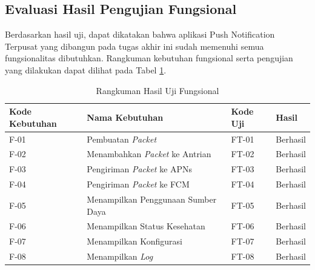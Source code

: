 \subsection{Evaluasi Hasil Pengujian Fungsional}
\par Berdasarkan hasil uji, dapat dikatakan bahwa aplikasi Push Notification Terpusat yang dibangun pada tugas akhir ini sudah memenuhi semua fungsionalitas dibutuhkan. Rangkuman kebutuhan fungsional serta pengujian yang dilakukan dapat dilihat pada Tabel \ref{t:eval_f}.
\begin{longtable}{|p{1.5cm}|p{3.5cm}|p{1.5cm}|p{1.5cm}|}
	\caption{Rangkuman Hasil Uji Fungsional} \label{t:eval_f} \\ \hline
	\rowcolor{lightgray} Kode Kebutuhan & Nama Kebutuhan & Kode Uji & Hasil \\ \hline
	F-01 & Pembuatan \textit{Packet} & FT-01 & Berhasil \\ \hline
	F-02 & Menambahkan \textit{Packet} ke Antrian & FT-02 & Berhasil \\ \hline
	F-03 & Pengiriman \textit{Packet} ke APNs & FT-03 & Berhasil \\ \hline
	F-04 & Pengiriman \textit{Packet} ke FCM & FT-04 & Berhasil \\ \hline
	F-05 & Menampilkan Penggunaan Sumber Daya & FT-05 & Berhasil \\ \hline
	F-06 & Menampilkan Status Kesehatan & FT-06 & Berhasil \\ \hline
	F-07 & Menampilkan Konfigurasi & FT-07 & Berhasil \\ \hline
	F-08 & Menampilkan \textit{Log} & FT-08 & Berhasil \\ \hline
\end{longtable}


